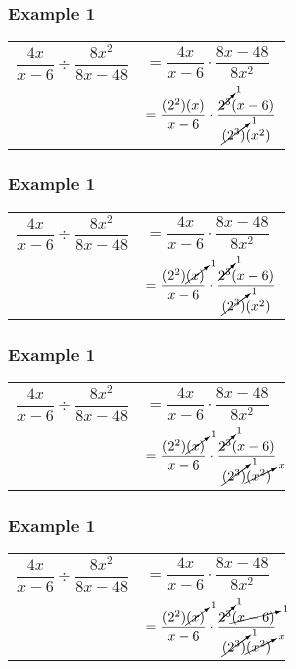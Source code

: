 \documentclass[14pt]{beamer}
\begin{document}
    \begin{frame}
   	\frametitle{Example 1}
   	\begin{tabular}{ll}
   		$\dfrac{4x}{x - 6} \div \dfrac{8x^2}{8x - 48} $ & $= \dfrac{4x}{x - 6} \cdot \dfrac{8x - 48}{8x^2} $ \\[1em]
   		
   		& $= \dfrac{(2^2) (x)}{ x - 6} \cdot \dfrac{ \cancelto{1}{2^3}  (x  - 6)}{ \cancelto{1}{(2^3)}  (x^2)} $ \\
   	\end{tabular}
   \end{frame}

    \begin{frame}
   	\frametitle{Example 1}
   	\begin{tabular}{ll}
   		$\dfrac{4x}{x - 6} \div \dfrac{8x^2}{8x - 48} $ & $= \dfrac{4x}{x - 6} \cdot \dfrac{8x - 48}{8x^2} $ \\[1em]
   		
   		& $= \dfrac{(2^2) \cancelto{1}{(x)}}{ x - 6} \cdot \dfrac{ \cancelto{1}{2^3}  (x  - 6)}{ \cancelto{1}{(2^3)}  (x^2)} $ \\
   	\end{tabular}
   \end{frame}

    \begin{frame}
    	\frametitle{Example 1}
    	\begin{tabular}{ll}
    		$\dfrac{4x}{x - 6} \div \dfrac{8x^2}{8x - 48} $ & $= \dfrac{4x}{x - 6} \cdot \dfrac{8x - 48}{8x^2} $ \\[1em]
    		
    		& $= \dfrac{(2^2) \cancelto{1}{(x)}}{ x - 6} \cdot \dfrac{ \cancelto{1}{2^3}  (x  - 6)}{ \cancelto{1}{(2^3)}  \cancelto{x}{(x^2)}} $ \\
    	\end{tabular}
    \end{frame}

    \begin{frame}
    	\frametitle{Example 1}
    	\begin{tabular}{ll}
    		$\dfrac{4x}{x - 6} \div \dfrac{8x^2}{8x - 48} $ & $= \dfrac{4x}{x - 6} \cdot \dfrac{8x - 48}{8x^2} $ \\[1em]
    		
    		& $= \dfrac{(2^2) \cancelto{1}{(x)}}{ x - 6} \cdot \dfrac{ \cancelto{1}{2^3}  \cancelto{1}{(x  - 6)}}{ \cancelto{1}{(2^3)}  \cancelto{x}{(x^2)}} $ \\
    	\end{tabular}
    \end{frame}
\end{document}
